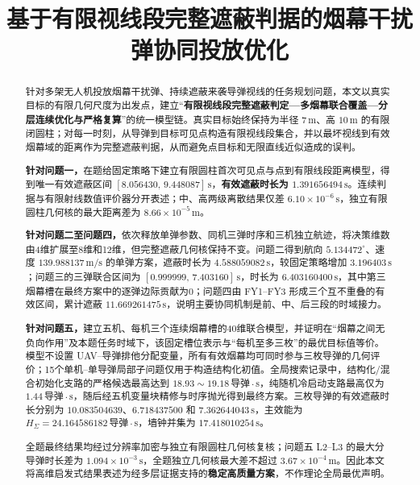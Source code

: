\documentclass{cumcmthesis}
\title{基于有限视线段完整遮蔽判据的烟幕干扰弹协同投放优化}
\newcommand{\abslead}[1]{{\sffamily\bfseries #1}}
\newcommand{\absstrong}[1]{{\sffamily\bfseries\boldmath #1}}
\begin{document}
\maketitle
\begin{abstract}
\setlength{\parindent}{2em}
\setlength{\parskip}{0.10em}
针对多架无人机投放烟幕干扰弹、持续遮蔽来袭导弹视线的任务规划问题，本文以真实目标的有限几何尺度为出发点，建立“\absstrong{有限视线段完整遮蔽判定—多烟幕联合覆盖—分层连续优化与严格复算}”的统一模型链。真实目标始终保持为半径 $7\,\mathrm m$、高 $10\,\mathrm m$ 的有限闭圆柱；对每一时刻，从导弹到目标可见点构造有限视线段集合，并以最坏视线到有效烟幕域的距离作为完整遮蔽判据，从而避免点目标和无限直线近似造成的误判。

\abslead{针对问题一，}在题给固定策略下建立有限圆柱首次可见点与点到有限线段距离模型，得到唯一有效遮蔽区间 $[8.056430,\,9.448087]\,\mathrm s$，\absstrong{有效遮蔽时长为 $1.391656494\,\mathrm s$}。连续判据与有限射线数值评价器分开表述；中、高两级离散结果仅差 $6.10\times10^{-6}\,\mathrm s$，独立有限圆柱几何核的最大距离差为 $8.66\times10^{-5}\,\mathrm m$。

\abslead{针对问题二至问题四，}依次释放单弹参数、同机三弹时序和三机独立航迹，将决策维数由4维扩展至8维和12维，但完整遮蔽几何核保持不变。问题二得到航向 $5.134472^\circ$、速度 $139.988137\,\mathrm{m/s}$ 的单弹方案，遮蔽时长为 \absstrong{$4.588059082\,\mathrm s$}，较固定策略增加 $3.196403\,\mathrm s$；问题三的三弹联合区间为 $[0.999999,\,7.403160]\,\mathrm s$，时长为 \absstrong{$6.403160400\,\mathrm s$}，其中第三烟幕槽在最终方案中的逐弹边际贡献为0；问题四由 FY1--FY3 形成三个互不重叠的有效区间，累计遮蔽 \absstrong{$11.669261475\,\mathrm s$}，说明主要协同机制是前、中、后三段的时域接力。

\abslead{针对问题五，}建立五机、每机三个连续烟幕槽的40维联合模型，并证明在“烟幕之间无负向作用”及本题任务时域下，该固定槽位表示与“每机至多三枚”的最优目标值等价。模型不设置 UAV--导弹排他分配变量，所有有效烟幕均可同时参与三枚导弹的几何评价；15个单机--单导弹局部子问题仅用于构造结构化初值。全局搜索记录中，结构化/混合初始化支路的严格候选最高达到 $18.93\sim19.18\,\text{导弹}\cdot\mathrm s$，纯随机冷启动支路最高仅为 $1.44\,\text{导弹}\cdot\mathrm s$，随后经五机变量块精修与时序抛光得到最终方案。三枚导弹的有效遮蔽时长分别为 $10.083504639$、$6.718437500$ 和 $7.362644043\,\mathrm s$，主效能为 \absstrong{$H_\Sigma=24.164586182\,\text{导弹}\cdot\mathrm s$}，墙钟并集为 $17.418010254\,\mathrm s$。

全题最终结果均经过分辨率加密与独立有限圆柱几何核复核；问题五 L2--L3 的最大分导弹时长差为 $1.094\times10^{-3}\,\mathrm s$，全题独立几何核最大差不超过 $3.67\times10^{-4}\,\mathrm m$。因此本文将高维启发式结果表述为经多层证据支持的\absstrong{稳定高质量方案}，不作理论全局最优声明。
\end{abstract}
\clearpage









\end{document}
